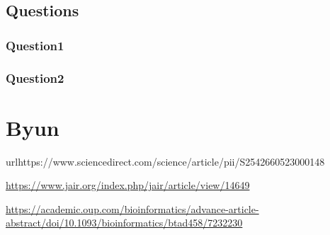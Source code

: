 \documentclass{article}
\begin{document}
\subsection{Questions}

\subsubsection{Question1}

\subsubsection{Question2}


\section{Byun}

url{https://www.sciencedirect.com/science/article/pii/S2542660523000148}


\url{https://www.jair.org/index.php/jair/article/view/14649}


\url{https://academic.oup.com/bioinformatics/advance-article-abstract/doi/10.1093/bioinformatics/btad458/7232230}
\end{document}
